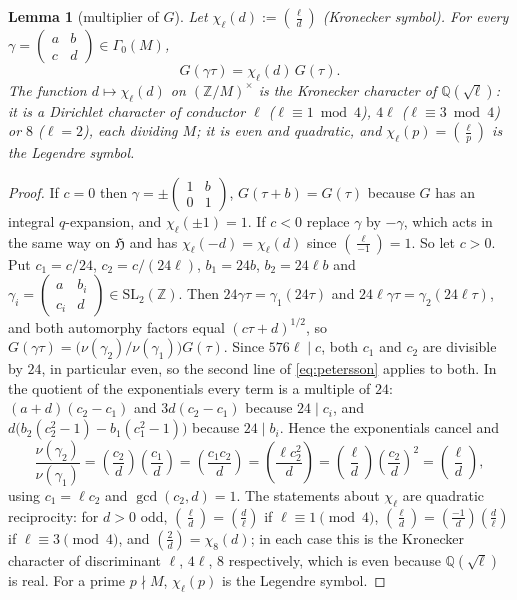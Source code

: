 \documentclass[11pt,a4paper]{article}
\numberwithin{equation}{section}
\newtheorem{lemma}[theorem]{Lemma}
\theoremstyle{definition}
\theoremstyle{remark}
\newcommand{\Z}{\mathbb Z}
\newcommand{\Q}{\mathbb Q}
\newcommand{\leg}[2]{\left(\frac{#1}{#2}\right)}
\begin{document}
\begin{lemma}[multiplier of $G$]\label{lem:mult}
Let $\chi_\ell(d):=\leg{\ell}{d}$ (Kronecker symbol). For every
$\gamma=\begin{pmatrix}a&b\\c&d\end{pmatrix}\in\Gamma_0(M)$,
\[
G(\gamma\tau)=\chi_\ell(d)\,G(\tau).
\]
The function $d\mapsto\chi_\ell(d)$ on $(\Z/M)^\times$ is the Kronecker character of
$\Q(\sqrt\ell)$: it is a Dirichlet character of conductor $\ell$ ($\ell\equiv1\bmod4$),
$4\ell$ ($\ell\equiv3\bmod4$) or $8$ ($\ell=2$), each dividing $M$; it is even and quadratic, and
$\chi_\ell(p)=\leg{\ell}{p}$ is the Legendre symbol.
\end{lemma}
\begin{proof}
If $c=0$ then $\gamma=\pm\begin{pmatrix}1&b\\0&1\end{pmatrix}$, $G(\tau+b)=G(\tau)$ because $G$ has
an integral $q$-expansion, and $\chi_\ell(\pm1)=1$. If $c<0$ replace $\gamma$ by $-\gamma$, which
acts in the same way on $\mathfrak H$ and has $\chi_\ell(-d)=\chi_\ell(d)$ since $\leg{\ell}{-1}=1$.
So let $c>0$. Put $c_1=c/24$, $c_2=c/(24\ell)$, $b_1=24b$, $b_2=24\ell b$ and
$\gamma_i=\begin{pmatrix}a&b_i\\c_i&d\end{pmatrix}\in\mathrm{SL}_2(\Z)$. Then
$24\gamma\tau=\gamma_1(24\tau)$ and $24\ell\gamma\tau=\gamma_2(24\ell\tau)$, and both automorphy
factors equal $(c\tau+d)^{1/2}$, so $G(\gamma\tau)=\bigl(\nu(\gamma_2)/\nu(\gamma_1)\bigr)G(\tau)$.
Since $576\ell\mid c$, both $c_1$ and $c_2$ are divisible by $24$, in particular even, so the second
line of \eqref{eq:petersson} applies to both. In the quotient of the exponentials every term is a
multiple of $24$: $(a+d)(c_2-c_1)$ and $3d(c_2-c_1)$ because $24\mid c_i$, and
$d\bigl(b_2(c_2^2-1)-b_1(c_1^2-1)\bigr)$ because $24\mid b_i$. Hence the exponentials cancel and
\[
\frac{\nu(\gamma_2)}{\nu(\gamma_1)}=\leg{c_2}{d}\leg{c_1}{d}=\leg{c_1c_2}{d}=\leg{\ell c_2^2}{d}
=\leg{\ell}{d}\leg{c_2}{d}^{2}=\leg{\ell}{d},
\]
using $c_1=\ell c_2$ and $\gcd(c_2,d)=1$. The statements about $\chi_\ell$ are quadratic
reciprocity: for $d>0$ odd, $\leg{\ell}{d}=\leg{d}{\ell}$ if $\ell\equiv1\pmod 4$,
$\leg{\ell}{d}=\leg{-1}{d}\leg{d}{\ell}$ if $\ell\equiv3\pmod4$, and $\leg{2}{d}=\chi_8(d)$; in each
case this is the Kronecker character of discriminant $\ell$, $4\ell$, $8$ respectively, which is even
because $\Q(\sqrt\ell)$ is real. For a prime $p\nmid M$, $\chi_\ell(p)$ is the Legendre symbol.
\end{proof}
\end{document}
